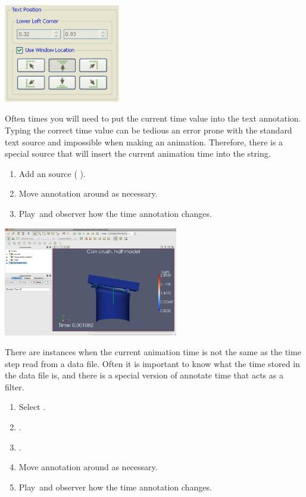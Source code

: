 \begin{inlinefig}
  \includegraphics[width=2in]{images/TextPosition}
\end{inlinefig}

Often times you will need to put the current time value into the text
annotation.  Typing the correct time value can be tedious an error prone
with the standard text source and impossible when making an animation.
Therefore, there is a special  source that will
insert the current animation time into the string.

\begin{enumerate}
\item Add an  source ( \ra {}).
\item Move annotation around as necessary.
\item Play~\vcrPlay and observer how the time annotation changes.
  \savecounter
\end{enumerate}

\begin{inlinefig}
  \includegraphics[width=3in]{images/AnnotateTimeSource}
\end{inlinefig}

There are instances when the current animation time is not the same as the
time step read from a data file.  Often it is important to know what the
time stored in the data file is, and there is a special version of annotate
time that acts as a filter.

\begin{enumerate}
  \restorecounter
\item Select .
\item {} \ra {} \ra {}. 
\item \apply.
\item Move annotation around as necessary.
\item Play~\vcrPlay and observer how the time annotation changes.
\end{enumerate}


